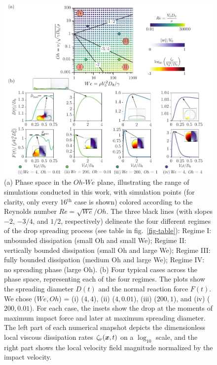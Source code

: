 \documentclass[preprint,amssymb,superscriptaddress,aps,prl,floatfix]{revtex4-1}
\def\x{{\mbox{\boldmath$x$}}}
\begin{document}
\begin{figure}
\centering
\includegraphics[width=\textwidth]{Figure1_v5-eps-converted-to.pdf}
\caption{(a) Phase space
 in the $Oh$-$We$ plane, illustrating the range of simulations conducted in this work, with simulation points (for clarity, only every 16$^{\text{th}}$ case is shown) colored according to the Reynolds number $Re = \sqrt{We}/Oh$.
 The three black lines (with slopes $-2$, $ -3/4$, 
 and $1/2$, respectively)
 delineate the  four different regimes of the drop spreading process
 (see table in fig.\ \ref{fig-table}): 
 Regime I: unbounded dissipation
 (small Oh and small We);
 Regime II: vertically bounded dissipation 
 (small Oh and large We);
 Regime III: fully bounded dissipation  
 (medium Oh and large We);
 Regime IV: no spreading phase 
 (large Oh). 
 (b) Four typical cases across the phase space, representing each of the four regimes. The plots show
 the spreading diameter $D(t)$ and the normal 
 reaction force $F(t)$. 
 We chose ($We, Oh$) = (i) ($4, 4$), (ii) ($4, 0.01$), (iii) ($200, 1$), and (iv) ($200, 0.01$). For each case, the insets show the drop at the moments of maximum impact force and later at maximum spreading diameter. The left part of each numerical snapshot depicts the dimensionless local viscous dissipation rates $\zeta_\nu (\x , t) $ \cite{supplMaterial} on a $\log_{10}$ scale, and the right part shows the local velocity field magnitude normalized by the impact velocity.}
\label{fig:1}
\end{figure}
\end{document}
